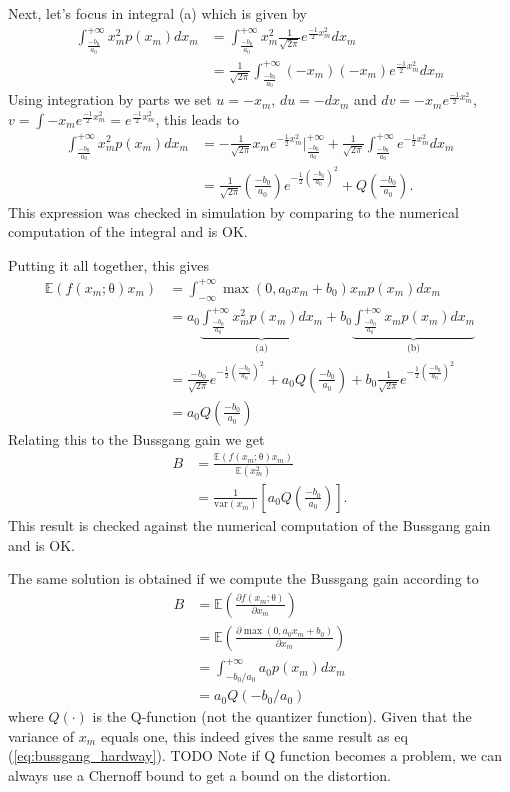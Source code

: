 \documentclass[12pt]{article}
\newcommand{\vect}[1]{\boldsymbol{\mathrm{#1}}}
\newcommand{\TODO}[1]{{\color{red} TODO {#1}}}
\newcommand{\expt}[1]{\mathbb{E}\left(#1\right)}
\theoremstyle{remark}
\begin{document}
Next, let's focus in integral (a) which is given by 
\begin{align}
	\int_{\frac{-b_0}{a_0}}^{+\infty} x_m^2 p(x_m) dx_m &= \int_{\frac{-b_0}{a_0}}^{+\infty} x_m^2\frac{1}{\sqrt{2\pi}} e^{\frac{-1}{2} x_m^2} dx_m \\
	&= \frac{1}{\sqrt{2\pi}} \int_{\frac{-b_0}{a_0}}^{+\infty} (-x_m)(-x_m) e^{\frac{-1}{2} x_m^2} dx_m 
\end{align}
Using integration by parts we set $u=-x_m$, $du=-dx_m$ and $dv=-x_me^{\frac{-1}{2}x_m^2}$, $v=\int -x_me^{\frac{-1}{2}x_m^2} = e^{\frac{-1}{2}x_m^2}$, this leads to 
\begin{align}
	\int_{\frac{-b_0}{a_0}}^{+\infty} x_m^2 p(x_m) dx_m &=  -\frac{1}{\sqrt{2\pi}}x_m e^{-\frac{1}{2}x_m^2}\Bigg|_{\frac{-b_0}{a_0}}^{+\infty} +  \frac{1}{\sqrt{2\pi}} \int_{\frac{-b_0}{a_0}}^{+\infty} e^{-\frac{1}{2}x_m^2}dx_m \\
	&=  \frac{1}{\sqrt{2\pi}} \left(\frac{-b_0}{a_0}\right) e^{-\frac{1}{2} \left(\frac{-b_0}{a_0}\right)^2} + Q\left(\frac{-b_0}{a_0}\right).
\end{align}
This expression was checked in simulation by comparing to the numerical computation of the integral and is OK.


Putting it all together, this gives 
\begin{align}
	\expt{f(x_m; \vect{\theta})x_m} &= \int_{-\infty}^{+\infty} \max(0, a_0x_m + b_0) x_m p(x_m) dx_m\\
	&= a_0\underbrace{\int_{\frac{-b_0}{a_0}}^{+\infty} x_m^2 p(x_m) dx_m}_{\text{(a)}} + b_0 \underbrace{\int_{\frac{-b_0}{a_0}}^{+\infty} x_m p(x_m) dx_m}_{\text{(b)}}\\
	&= \frac{-b_0}{\sqrt{2\pi}} e^{-\frac{1}{2} \left(\frac{-b_0}{a_0}\right)^2} + a_0 Q\left(\frac{-b_0}{a_0}\right) + b_0 \frac{1}{\sqrt{2\pi}} e^{-\frac{1}{2} \left(\frac{-b_0}{a_0}\right)^2} \\
	&= a_0 Q\left(\frac{-b_0}{a_0}\right) \label{eq:bussgang_hardway}
\end{align}
Relating this to the Bussgang gain we get 
\begin{align}
	B &= \frac{\expt{f(x_m; \vect{\theta})x_m}}{\expt{x_m^2}}\\
	&= \frac{1}{\mathrm{var}(x_m)} \left[a_0 Q\left(\frac{-b_0}{a_0}\right) \right].
\end{align}
This result is checked against the numerical computation of the Bussgang gain and is OK.

The same solution is obtained if we compute the Bussgang gain according to 
\begin{align}
	B &= \expt{\frac{\partial f(x_m; \vect{\theta})}{\partial x_m}}\\
	&= \expt{\frac{\partial \max(0, a_0x_m + b_0) }{\partial x_m}}\\
	&=  \int_{-b_0/a_0}^{+\infty} a_0 p(x_m) dx_m \\
	&= a_0 Q(-b_0/a_0) 
\end{align}
where $Q(\cdot)$ is the Q-function (not the quantizer function). Given that the variance of $x_m$ equals one, this indeed gives the same result as eq (\ref{eq:bussgang_hardway}).
\TODO{Note if Q function becomes a problem, we can always use a Chernoff bound to get a bound on the distortion.}
\end{document}
